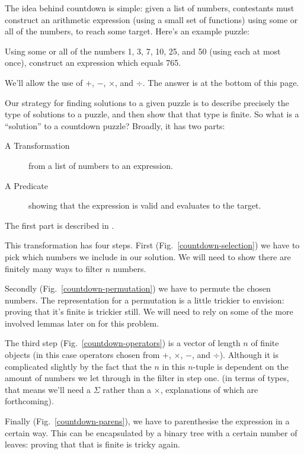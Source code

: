 The idea behind countdown is simple: given a list of numbers, contestants must
construct an arithmetic expression (using a small set of functions) using some
or all of the numbers, to reach some target.
Here's an example puzzle:
\begin{displayquote}
  Using some or all of the numbers 1, 3, 7, 10, 25, and 50 (using each at most
  once), construct an expression which equals 765.
\end{displayquote}
We'll allow the use of \(+\), \(-\), \(\times\), and \(\div\).
The answer is at the bottom of this page\footnotemark.


Our strategy for finding solutions to a given puzzle is to describe precisely
the type of solutions to a puzzle, and then show that that type is finite.
So what is a ``solution'' to a countdown puzzle?
Broadly, it has two parts:
\begin{description}
  \item[A Transformation] from a list of numbers to an expression.
  \item[A Predicate] showing that the expression is valid and evaluates to the
    target.
\end{description}
The first part is described in .


This transformation has four steps.
First (Fig.~\ref{countdown-selection}) we have to pick which numbers we include
in our solution.
We will need to show there are finitely many ways to filter \(n\) numbers.

Secondly (Fig.~\ref{countdown-permutation}) we have to permute the chosen
numbers.
The representation for a permutation is a little trickier to envision: proving
that it's finite is trickier still.
We will need to rely on some of the more involved lemmas later on for this
problem.

The third step (Fig.~\ref{countdown-operators}) is a vector of length \(n\) of finite objects (in this case operators
chosen from \(+\), \(\times\), \(-\), and \(\div\)).
Although it is complicated slightly by the fact that the \(n\) in this
\(n\)-tuple is dependent on the amount of numbers we let through in the filter
in step one.
(in terms of types, that means we'll need a \(\Sigma\) rather than a
\(\times\), explanations of which are forthcoming).

Finally (Fig.~\ref{countdown-parens}), we have to parenthesise the expression in
a certain way.
This can be encapsulated by a binary tree with a certain number of leaves:
proving that that is finite is tricky again.

